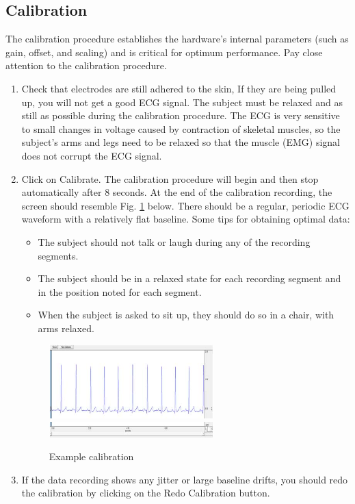 \documentclass{article}
\begin{document}
\subsection*{Calibration}
\begin{info}
	The calibration procedure establishes the hardware's internal parameters (such as gain, offset, and scaling) and is critical for optimum performance. Pay close attention to the calibration procedure.
\end{info}
\begin{enumerate}
	\item Check that electrodes are still adhered to the skin, If they are being pulled up, you will not get a good ECG signal. The subject must be relaxed and as still as possible during the calibration procedure. The ECG is very sensitive to small changes in voltage caused by contraction of skeletal muscles, so the subject's arms and legs need to be relaxed so that the muscle (EMG) signal does not corrupt the ECG signal.
	\item Click on Calibrate. The calibration procedure will begin and then stop automatically after 8 seconds. At the end of the calibration recording, the screen should resemble Fig. \ref{calibration} below. There should be a regular, periodic ECG waveform with a relatively flat baseline. Some tips for obtaining optimal data:\begin{itemize}
		\item The subject should not talk or laugh during any of the recording segments.
		\item The subject should be in a relaxed state for each recording segment and in the position noted for each segment.
		\item When the subject is asked to sit up, they should do so in a chair, with arms relaxed.
		\end{itemize}
		
		\begin{figure}[h]
	\centering\includegraphics[width=0.6\textwidth]{../images/ECG_I_7a.jpg}
	\includegraphics[width=0.6\textwidth]{../images/ECG_I_7b.jpg}
		\caption{Example calibration}
		\label{calibration}
		\end{figure}
		
	\item If the data recording shows any jitter or large baseline drifts, you should redo the calibration by clicking on the Redo Calibration button.
\end{enumerate}
\end{document}
